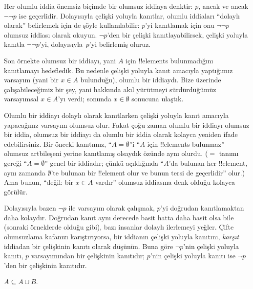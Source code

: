 \documentclass[../../../include/open-logic-section]{subfiles}
\begin{document}
Her olumlu iddia önemsiz biçimde bir olumsuz iddiaya denktir: $p$, ancak
ve ancak $\lnot\lnot p$ ise geçerlidir. Dolayısıyla çelişki yoluyla
kanıtlar, olumlu iddiaları ``dolaylı olarak'' belirlemek için de şöyle
kullanılabilir: $p$'yi kanıtlamak için onu $\lnot\lnot p$ olumsuz
iddiası olarak okuyun. $\lnot p$'den bir çelişki kanıtlayabilirsek,
çelişki yoluyla kanıtla $\lnot\lnot p$'yi, dolayısıyla~$p$'yi belirlemiş
oluruz.

Son örnekte olumsuz bir iddiayı, yani $A$ için !!{element}s
bulunmadığını kanıtlamayı hedefledik. Bu nedenle çelişki yoluyla kanıt
amacıyla yaptığımız varsayım (yani bir $x \in A$ bulunduğu), olumlu bir
iddiaydı. Bize üzerinde çalışabileceğimiz bir şey, yani hakkında akıl
yürütmeyi sürdürdüğümüz varsayımsal $x \in A$'yı verdi; sonunda $x \in
\emptyset$ sonucuna ulaştık.

Olumlu bir iddiayı dolaylı olarak kanıtlarken çelişki yoluyla kanıt
amacıyla yapacağınız varsayım olumsuz olur. Fakat çoğu zaman olumlu bir
  iddiayı olumsuz bir iddia, olumsuz bir iddiayı da olumlu bir iddia
  olarak kolayca yeniden ifade edebilirsiniz. Bir önceki kanıtımız,
  ``$A = \emptyset$''i ``$A$ için !!{element}s bulunmaz'' olumsuz
  artbileşeni yerine kanıtlamış olsaydık özünde aynı olurdu. ($=$ tanımı gereği
``$A = \emptyset$'' genel bir iddiadır; çünkü açıldığında ``$A$'da
bulunan her !!{element}, aynı zamanda $\emptyset$'te bulunan bir
!!{element} olur ve bunun tersi de geçerlidir'' olur.) Ama bunun,
``değil: bir $x \in A$ vardır'' olumsuz
iddiasına denk olduğu kolayca görülür.

Dolayısıyla bazen $\lnot p$ ile varsayım olarak çalışmak, $p$'yi
doğrudan kanıtlamaktan daha kolaydır. Doğrudan kanıt aynı derecede basit
hatta daha basit olsa bile (sonraki örneklerde olduğu gibi), bazı
insanlar dolaylı ilerlemeyi yeğler. Çifte olumsuzlama kafanızı
karıştırıyorsa, bir iddianın çelişki yoluyla kanıtını, \emph{karşıt}
iddiadan bir çelişkinin kanıtı olarak düşünün. Buna göre $\lnot p$'nin
çelişki yoluyla kanıtı, $p$ varsayımından bir çelişkinin kanıtıdır;
$p$'nin çelişki yoluyla kanıtı ise $\lnot p$'den bir çelişkinin
kanıtıdır.

\begin{prop}
$A \subseteq A \cup B$.
\end{prop}
\end{document}
